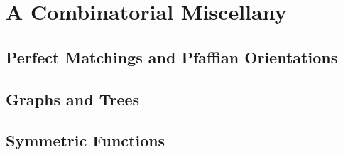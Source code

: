 
\chapter{A Combinatorial Miscellany}





\section{Perfect Matchings and Pfaffian Orientations}

\section{Graphs and Trees}

\section{Symmetric Functions}







\endinput
